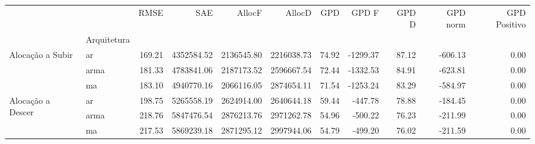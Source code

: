 \begin{tabular}{llrrrrrrrrr}
\toprule
 &  & RMSE & SAE & AllocF & AllocD & GPD & GPD F & GPD D & GPD norm & GPD Positivo \\
 & Arquitetura &  &  &  &  &  &  &  &  &  \\
\midrule
\multirow[t]{3}{*}{Alocação a Subir} & ar & 169.21 & 4352584.52 & 2136545.80 & 2216038.73 & 74.92 & -1299.37 & 87.12 & -606.13 & 0.00 \\
 & arma & 181.33 & 4783841.06 & 2187173.52 & 2596667.54 & 72.44 & -1332.53 & 84.91 & -623.81 & 0.00 \\
 & ma & 183.10 & 4940770.16 & 2066116.05 & 2874654.11 & 71.54 & -1253.24 & 83.29 & -584.97 & 0.00 \\
\cline{1-11}
\multirow[t]{3}{*}{Alocação a Descer} & ar & 198.75 & 5265558.19 & 2624914.00 & 2640644.18 & 59.44 & -447.78 & 78.88 & -184.45 & 0.00 \\
 & arma & 218.76 & 5847476.54 & 2876213.76 & 2971262.78 & 54.96 & -500.22 & 76.23 & -211.99 & 0.00 \\
 & ma & 217.53 & 5869239.18 & 2871295.12 & 2997944.06 & 54.79 & -499.20 & 76.02 & -211.59 & 0.00 \\
\cline{1-11}
\bottomrule
\end{tabular}
